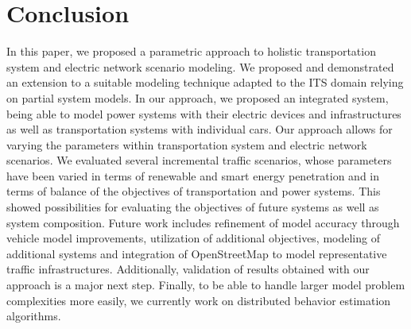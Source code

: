 \section{Conclusion}
\label{section:conclusion}

In this paper, we proposed a parametric approach to holistic transportation system and electric network scenario modeling. We proposed and demonstrated an extension to a suitable modeling technique adapted to the ITS domain relying on partial system models. 
In our approach, we proposed an integrated system, being able to model power systems with their electric devices and infrastructures as well as transportation systems with individual cars. Our approach allows for varying the parameters within transportation system and electric network scenarios. We evaluated several incremental traffic scenarios, whose parameters have been varied in terms of renewable and smart energy penetration and in terms of balance of the objectives of transportation and power systems. 
This showed possibilities for evaluating the objectives of future systems as well as system composition. Future work includes refinement of model accuracy through vehicle model improvements, utilization of additional objectives, modeling of additional systems and integration of OpenStreetMap to model representative traffic infrastructures. Additionally, validation of results obtained with our approach is a major next step. Finally, to be able to handle larger model problem complexities more easily, we currently work on distributed behavior estimation algorithms.

